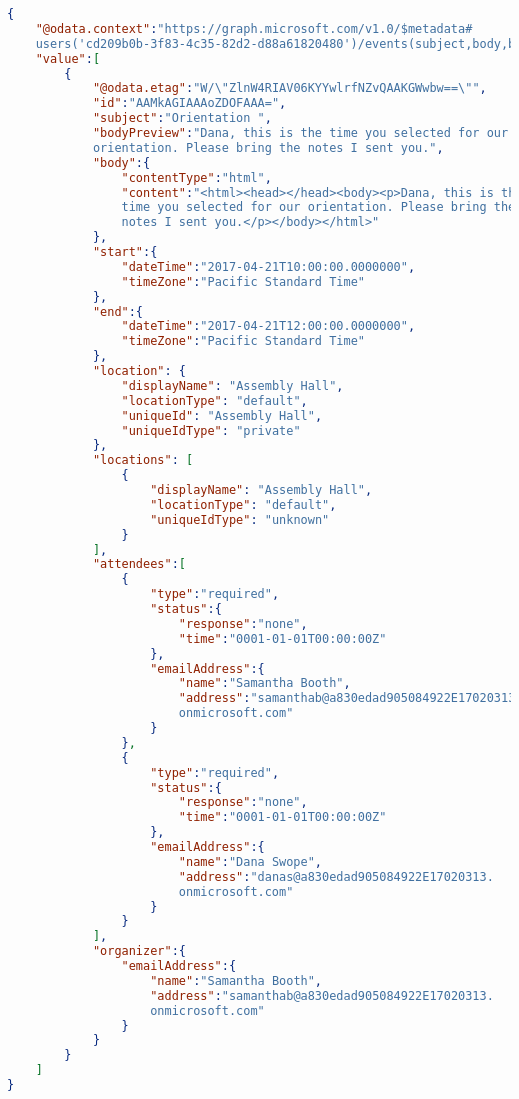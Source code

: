 \begin{description}
\begin{lstlisting}[caption={Contoh respon dari request List events diatas},label={lst:atribute-view},language=json]
{
    "@odata.context":"https://graph.microsoft.com/v1.0/$metadata#
    users('cd209b0b-3f83-4c35-82d2-d88a61820480')/events(subject,body,bodyPreview,organizer,attendees,start,end,location)",
    "value":[
        {
            "@odata.etag":"W/\"ZlnW4RIAV06KYYwlrfNZvQAAKGWwbw==\"",
            "id":"AAMkAGIAAAoZDOFAAA=",
            "subject":"Orientation ",
            "bodyPreview":"Dana, this is the time you selected for our 
            orientation. Please bring the notes I sent you.",
            "body":{
                "contentType":"html",
                "content":"<html><head></head><body><p>Dana, this is the 
                time you selected for our orientation. Please bring the 
                notes I sent you.</p></body></html>"
            },
            "start":{
                "dateTime":"2017-04-21T10:00:00.0000000",
                "timeZone":"Pacific Standard Time"
            },
            "end":{
                "dateTime":"2017-04-21T12:00:00.0000000",
                "timeZone":"Pacific Standard Time"
            },
            "location": {
                "displayName": "Assembly Hall",
                "locationType": "default",
                "uniqueId": "Assembly Hall",
                "uniqueIdType": "private"
            },
            "locations": [
                {
                    "displayName": "Assembly Hall",
                    "locationType": "default",
                    "uniqueIdType": "unknown"
                }
            ],
            "attendees":[
                {
                    "type":"required",
                    "status":{
                        "response":"none",
                        "time":"0001-01-01T00:00:00Z"
                    },
                    "emailAddress":{
                        "name":"Samantha Booth",
                        "address":"samanthab@a830edad905084922E17020313.
                        onmicrosoft.com"
                    }
                },
                {
                    "type":"required",
                    "status":{
                        "response":"none",
                        "time":"0001-01-01T00:00:00Z"
                    },
                    "emailAddress":{
                        "name":"Dana Swope",
                        "address":"danas@a830edad905084922E17020313.
                        onmicrosoft.com"
                    }
                }
            ],
            "organizer":{
                "emailAddress":{
                    "name":"Samantha Booth",
                    "address":"samanthab@a830edad905084922E17020313.
                    onmicrosoft.com"
                }
            }
        }
    ]
}
\end{lstlisting} 
	
\end{description}


